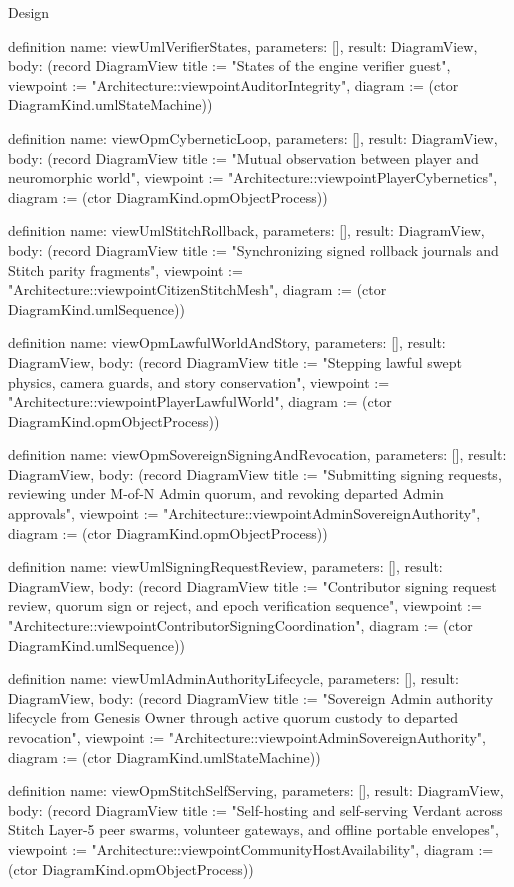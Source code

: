 \begin{lexlean}{Design}
\begin{semanticmodule}
definition{
  name: viewUmlVerifierStates,
  parameters: [],
  result: DiagramView,
  body: (record DiagramView {title := "States of the engine verifier guest", viewpoint := "Architecture::viewpointAuditorIntegrity", diagram := (ctor DiagramKind.umlStateMachine)})
}

definition{
  name: viewOpmCyberneticLoop,
  parameters: [],
  result: DiagramView,
  body: (record DiagramView {title := "Mutual observation between player and neuromorphic world", viewpoint := "Architecture::viewpointPlayerCybernetics", diagram := (ctor DiagramKind.opmObjectProcess)})
}

definition{
  name: viewUmlStitchRollback,
  parameters: [],
  result: DiagramView,
  body: (record DiagramView {title := "Synchronizing signed rollback journals and Stitch parity fragments", viewpoint := "Architecture::viewpointCitizenStitchMesh", diagram := (ctor DiagramKind.umlSequence)})
}

definition{
  name: viewOpmLawfulWorldAndStory,
  parameters: [],
  result: DiagramView,
  body: (record DiagramView {title := "Stepping lawful swept physics, camera guards, and story conservation", viewpoint := "Architecture::viewpointPlayerLawfulWorld", diagram := (ctor DiagramKind.opmObjectProcess)})
}

definition{
  name: viewOpmSovereignSigningAndRevocation,
  parameters: [],
  result: DiagramView,
  body: (record DiagramView {title := "Submitting signing requests, reviewing under M-of-N Admin quorum, and revoking departed Admin approvals", viewpoint := "Architecture::viewpointAdminSovereignAuthority", diagram := (ctor DiagramKind.opmObjectProcess)})
}

definition{
  name: viewUmlSigningRequestReview,
  parameters: [],
  result: DiagramView,
  body: (record DiagramView {title := "Contributor signing request review, quorum sign or reject, and epoch verification sequence", viewpoint := "Architecture::viewpointContributorSigningCoordination", diagram := (ctor DiagramKind.umlSequence)})
}

definition{
  name: viewUmlAdminAuthorityLifecycle,
  parameters: [],
  result: DiagramView,
  body: (record DiagramView {title := "Sovereign Admin authority lifecycle from Genesis Owner through active quorum custody to departed revocation", viewpoint := "Architecture::viewpointAdminSovereignAuthority", diagram := (ctor DiagramKind.umlStateMachine)})
}

definition{
  name: viewOpmStitchSelfServing,
  parameters: [],
  result: DiagramView,
  body: (record DiagramView {title := "Self-hosting and self-serving Verdant across Stitch Layer-5 peer swarms, volunteer gateways, and offline portable envelopes", viewpoint := "Architecture::viewpointCommunityHostAvailability", diagram := (ctor DiagramKind.opmObjectProcess)})
}


\end{semanticmodule}
\end{lexlean}
